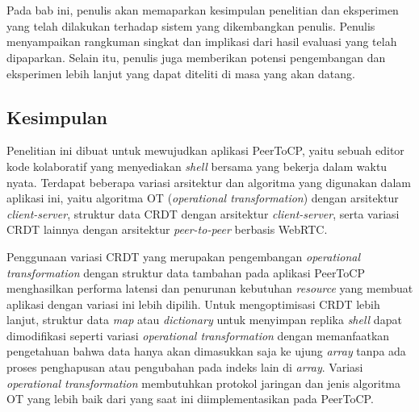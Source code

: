 \chapter{\kesimpulan}
\label{bab:6}
Pada bab ini, penulis akan memaparkan kesimpulan penelitian dan eksperimen yang telah dilakukan terhadap sistem yang dikembangkan penulis. Penulis menyampaikan rangkuman singkat dan implikasi dari hasil evaluasi yang telah dipaparkan. Selain itu, penulis juga memberikan potensi pengembangan dan eksperimen lebih lanjut yang dapat diteliti di masa yang akan datang.

\section{Kesimpulan}
\label{sec:kesimpulan}

Penelitian ini dibuat untuk mewujudkan aplikasi PeerToCP, yaitu sebuah editor kode kolaboratif yang menyediakan \textit{shell} bersama yang bekerja dalam waktu nyata. Terdapat beberapa variasi arsitektur dan algoritma yang digunakan dalam aplikasi ini, yaitu algoritma OT (\textit{operational transformation}) dengan arsitektur \textit{client-server}, struktur data CRDT dengan arsitektur \textit{client-server}, serta variasi CRDT lainnya dengan arsitektur \textit{peer-to-peer} berbasis WebRTC.

Penggunaan variasi CRDT yang merupakan pengembangan \textit{operational transformation} dengan struktur data tambahan pada aplikasi PeerToCP menghasilkan performa latensi dan penurunan kebutuhan \textit{resource} yang membuat aplikasi dengan variasi ini lebih dipilih. Untuk mengoptimisasi CRDT lebih lanjut, struktur data \textit{map} atau \textit{dictionary} untuk menyimpan replika \textit{shell} dapat dimodifikasi seperti variasi \textit{operational transformation} dengan memanfaatkan pengetahuan bahwa data hanya akan dimasukkan saja ke ujung \textit{array} tanpa ada proses penghapusan atau pengubahan pada indeks lain di \textit{array}. Variasi \textit{operational transformation} membutuhkan protokol jaringan dan jenis algoritma OT yang lebih baik dari yang saat ini diimplementasikan pada PeerToCP.

